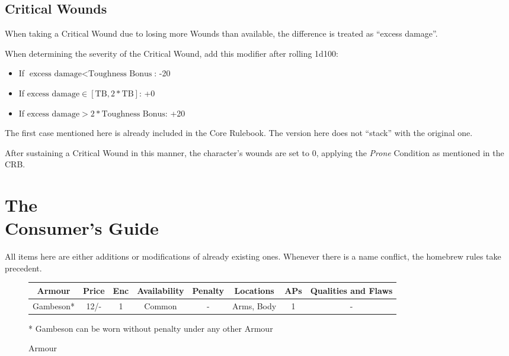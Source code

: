\documentclass[parskip=full,11pt]{wfrp-short}
\begin{document}
\subsection{Critical Wounds}
When taking a Critical Wound due to losing more Wounds than available, the
difference is treated as \enquote{excess damage}.

When determining the severity of the Critical Wound, add this modifier after
rolling 1d100:
\begin{itemize}
    \item If $\text{excess damage} < \text{Toughness Bonus}$: -20
    \item If $\text{excess damage} \in [\text{TB}, 2*\text{TB}]$: +0
    \item If $\text{excess damage} > 2* \text{Toughness Bonus}$: +20
\end{itemize}

The first case mentioned here is already included in the Core Rulebook.
The version here does not \enquote{stack} with the original one.

After sustaining a Critical Wound in this manner, the character's wounds are
set to 0, applying the \textit{Prone} Condition as mentioned in the CRB.

\section{The\\Consumer's Guide}

All items here are either additions or modifications of already existing ones.
Whenever there is a name conflict, the homebrew rules take precedent.

\begin{figure*}[b]
    \begin{tcolorbox}[standard jigsaw, colback=yellow!5!orange, opacityback=.25, boxrule=0pt]
    \caption{Armour}
    \centering
    \begin{tabu}{c|c|c|c|c|c|c|c}
        \rowfont{\bfseries} Armour & Price & Enc & Availability &
            Penalty & Locations & APs & Qualities and Flaws\\
        \hline
        Gambeson* & 12/- & 1 & Common & - & Arms, Body & 1 & -\\
    \end{tabu}
		\newline \newline
		* Gambeson can be worn without penalty under any other Armour
    \end{tcolorbox}
\end{figure*}
\end{document}
